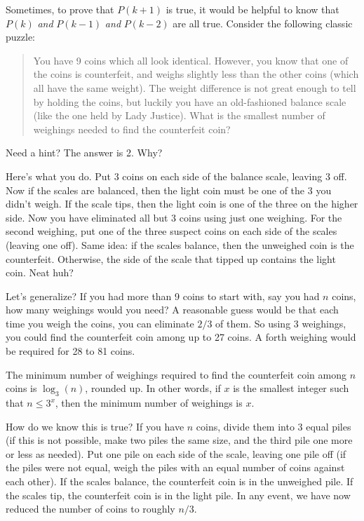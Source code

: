 \documentclass[12pt]{article}
\begin{document}
Sometimes, to prove that $P(k+1)$ is true, it would be helpful to know that $P(k)$ \emph{and} $P(k-1)$ \emph{and} $P(k-2)$ are all true.  Consider the following classic puzzle:

\begin{quote}
	You have 9 coins which all look identical.  However, you know that one of the coins is counterfeit, and weighs slightly less than the other coins (which all have the same weight).  The weight difference is not great enough to tell by holding the coins, but luckily you have an old-fashioned balance scale (like the one held by Lady Justice).  What is the smallest number of weighings needed to find the counterfeit coin?
\end{quote}

Need a hint?  The answer is 2.  Why?

Here's what you do.  Put 3 coins on each side of the balance scale, leaving 3 off.  Now if the scales are balanced, then the light coin must be one of the 3 you didn't weigh.  If the scale tips, then the light coin is one of the three on the higher side.  Now you have eliminated all but 3 coins using just one weighing.  For the second weighing, put one of the three suspect coins on each side of the scales (leaving one off).  Same idea: if the scales balance, then the unweighed coin is the counterfeit.  Otherwise, the side of the scale that tipped up contains the light coin.  Neat huh?

Let's generalize?  If you had more than 9 coins to start with, say you had $n$ coins, how many weighings would you need?  A reasonable guess would be that each time you weigh the coins, you can eliminate $2/3$ of them.  So using 3 weighings, you could find the counterfeit coin among up to 27 coins.  A forth weighing would be required for 28 to 81 coins.  

\begin{conjecture}
	The minimum number of weighings required to find the counterfeit coin among $n$ coins is $\log_3(n)$, rounded up.  In other words, if $x$ is the smallest integer such that $n \le 3^x$, then the minimum number of weighings is $x$. 
\end{conjecture}

How do we know this is true?  If you have $n$ coins, divide them into 3 equal piles (if this is not possible, make two piles the same size, and the third pile one more or less as needed).  Put one pile on each side of the scale, leaving one pile off (if the piles were not equal, weigh the piles with an equal number of coins against each other).  If the scales balance, the counterfeit coin is in the unweighed pile.  If the scales tip, the counterfeit coin is in the light pile.  In any event, we have now reduced the number of coins to roughly $n/3$.  
\end{document}
